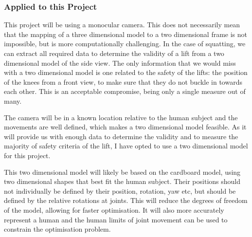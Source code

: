 \subsubsection{Applied to this Project}

This project will be using a monocular camera. This does not necessarily mean that the mapping of a three dimensional model to a two dimensional frame is not impossible, but is more computationally challenging. In the case of squatting, we can extract all required data to determine the validity of a lift from a two dimensional model of the side view. The only information that we would miss with a two dimensional model is one related to the safety of the lifts: the position of the knees from a front view, to make sure that they do not buckle in towards each other. This is an acceptable compromise, being only a single measure out of many.

The camera will be in a known location relative to the human subject and the movements are well defined, which makes a two dimensional model feasible. As it will provide us with enough data to determine the validity and to measure the majority of safety criteria of the lift, I have opted to use a two dimensional model for this project.

This two dimensional model will likely be based on the cardboard model, using two dimensional shapes that best fit the human subject. Their positions should not individually be defined by their position, rotation, yaw etc, but should be defined by the relative rotations at joints. This will reduce the degrees of freedom of the model, allowing for faster optimisation. It will also more accurately represent a human and the human limits of joint movement can be used to constrain the optimisation problem.